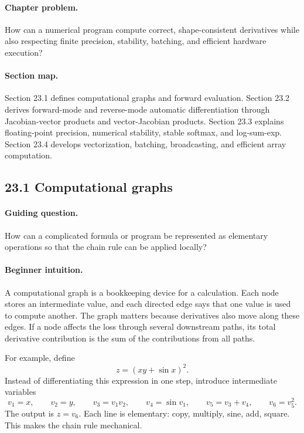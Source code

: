 \paragraph{Chapter problem.}
How can a numerical program compute correct, shape-consistent derivatives while also respecting finite precision, stability, batching, and efficient hardware execution?

\paragraph{Section map.}
Section 23.1 defines computational graphs and forward evaluation. Section 23.2 derives forward-mode and reverse-mode automatic differentiation through Jacobian-vector products and vector-Jacobian products. Section 23.3 explains floating-point precision, numerical stability, stable softmax, and log-sum-exp. Section 23.4 develops vectorization, batching, broadcasting, and efficient array computation.

\subsection{23.1 Computational graphs}

\paragraph{Guiding question.}
How can a complicated formula or program be represented as elementary operations so that the chain rule can be applied locally?

\paragraph{Beginner intuition.}
A computational graph is a bookkeeping device for a calculation. Each node stores an intermediate value, and each directed edge says that one value is used to compute another. The graph matters because derivatives also move along these edges. If a node affects the loss through several downstream paths, its total derivative contribution is the sum of the contributions from all paths.

For example, define
\[
z=(xy+\sin x)^2.
\]
Instead of differentiating this expression in one step, introduce intermediate variables
\[
v_1=x,\qquad v_2=y,\qquad v_3=v_1v_2,\qquad
v_4=\sin v_1,\qquad v_5=v_3+v_4,\qquad v_6=v_5^2.
\]
The output is \(z=v_6\). Each line is elementary: copy, multiply, sine, add, square. This makes the chain rule mechanical.

